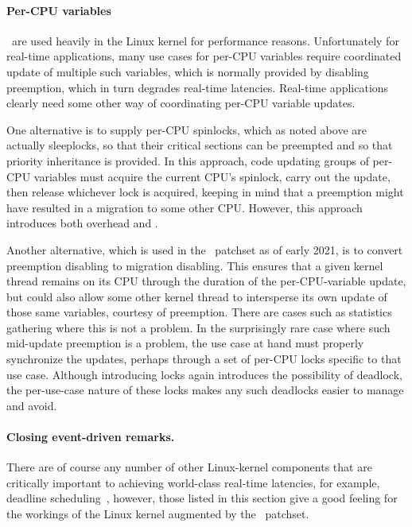 \paragraph{Per-CPU variables}\ are used heavily in the Linux kernel
for performance reasons.
Unfortunately for real-time applications, many use cases for per-CPU
variables require coordinated update of multiple such variables,
which is normally provided by disabling preemption, which in turn
degrades real-time latencies.
Real-time applications clearly need some other way of coordinating
per-CPU variable updates.

One alternative is to supply per-CPU spinlocks, which as noted above
are actually sleeplocks, so that their critical sections can be
preempted and so that priority inheritance is provided.
In this approach, code updating groups of per-CPU variables must
acquire the current CPU's spinlock, carry out the update, then
release whichever lock is acquired, keeping in mind that a preemption
might have resulted in a migration to some other CPU\@.
However, this approach introduces both overhead and .

Another alternative, which is used in the \rt\ patchset as of early 2021,
is to convert preemption disabling to migration disabling.
This ensures that a given kernel thread remains on its CPU through
the duration of the per-CPU-variable update, but could also allow some
other kernel thread to intersperse its own update of those same variables,
courtesy of preemption.
There are cases such as statistics gathering where this is not a problem.
In the surprisingly rare case where such mid-update preemption is a problem,
the use case at hand must properly synchronize the updates, perhaps through
a set of per-CPU locks specific to that use case.
Although introducing locks again introduces the possibility of deadlock,
the per-use-case nature of these locks makes any such deadlocks easier
to manage and avoid.

\paragraph{Closing event-driven remarks.}
There are of course any number of other Linux-kernel components that are
critically important to achieving world-class real-time latencies,
for example, deadline
scheduling~\cite{DanielBristot2018deadlinesched-1,DanielBristot2018deadlinesched-2},
however, those listed in this section give a good feeling for the workings
of the Linux kernel augmented by the \rt\ patchset.

